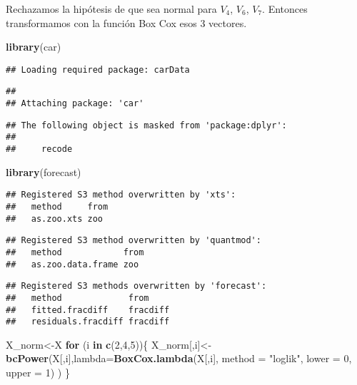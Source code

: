 \documentclass[]{article}
\newenvironment{Shaded}{\begin{snugshade}}{\end{snugshade}}
\newcommand{\ControlFlowTok}[1]{\textcolor[rgb]{0.13,0.29,0.53}{\textbf{#1}}}
\newcommand{\DataTypeTok}[1]{\textcolor[rgb]{0.13,0.29,0.53}{#1}}
\newcommand{\DecValTok}[1]{\textcolor[rgb]{0.00,0.00,0.81}{#1}}
\newcommand{\KeywordTok}[1]{\textcolor[rgb]{0.13,0.29,0.53}{\textbf{#1}}}
\newcommand{\NormalTok}[1]{#1}
\newcommand{\StringTok}[1]{\textcolor[rgb]{0.31,0.60,0.02}{#1}}
\begin{document}
Rechazamos la hipótesis de que sea normal para \(V_4\), \(V_6\),
\(V_7\). Entonces transformamos con la función Box Cox esos 3 vectores.

\begin{Shaded}
\begin{Highlighting}[]
\KeywordTok{library}\NormalTok{(car)}
\end{Highlighting}
\end{Shaded}

\begin{verbatim}
## Loading required package: carData
\end{verbatim}

\begin{verbatim}
## 
## Attaching package: 'car'
\end{verbatim}

\begin{verbatim}
## The following object is masked from 'package:dplyr':
## 
##     recode
\end{verbatim}

\begin{Shaded}
\begin{Highlighting}[]
\KeywordTok{library}\NormalTok{(forecast)}
\end{Highlighting}
\end{Shaded}

\begin{verbatim}
## Registered S3 method overwritten by 'xts':
##   method     from
##   as.zoo.xts zoo
\end{verbatim}

\begin{verbatim}
## Registered S3 method overwritten by 'quantmod':
##   method            from
##   as.zoo.data.frame zoo
\end{verbatim}

\begin{verbatim}
## Registered S3 methods overwritten by 'forecast':
##   method             from    
##   fitted.fracdiff    fracdiff
##   residuals.fracdiff fracdiff
\end{verbatim}

\begin{Shaded}
\begin{Highlighting}[]
\NormalTok{X_norm<-X}
\ControlFlowTok{for}\NormalTok{ (i }\ControlFlowTok{in} \KeywordTok{c}\NormalTok{(}\DecValTok{2}\NormalTok{,}\DecValTok{4}\NormalTok{,}\DecValTok{5}\NormalTok{))\{}
\NormalTok{  X_norm[,i]<-}\KeywordTok{bcPower}\NormalTok{(X[,i],}\DataTypeTok{lambda=}\KeywordTok{BoxCox.lambda}\NormalTok{(X[,i], }\DataTypeTok{method =} \StringTok{"loglik"}\NormalTok{, }\DataTypeTok{lower =} \DecValTok{0}\NormalTok{, }\DataTypeTok{upper =} \DecValTok{1}\NormalTok{) )}
\NormalTok{\}}
\end{Highlighting}
\end{Shaded}
\end{document}
